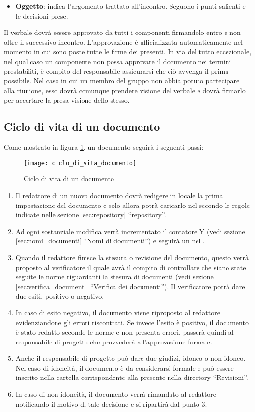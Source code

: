 \begin{itemize}
\begin{itemize}
\item \textbf{Oggetto}: indica l'argomento trattato all'incontro. Seguono i punti salienti e le decisioni prese.
\end{itemize}
Il verbale dovrà essere approvato da tutti i componenti firmandolo entro e non oltre il successivo incontro. L'approvazione è ufficializzata automaticamente nel momento in cui sono poste tutte le firme dei presenti. In via del tutto eccezionale, nel qual caso un componente non possa approvare il documento nei termini prestabiliti, è compito del responsabile assicurarsi che ciò avvenga il prima possibile. Nel caso in cui un membro del gruppo non abbia potuto partecipare alla riunione, esso dovrà comunque prendere visione del verbale e dovrà firmarlo per accertare la presa visione dello stesso.
\end{itemize}

\subsection{Ciclo di vita di un documento}
Come mostrato in figura \ref{fig:ciclo_di_vita_documento}, un documento seguirà i seguenti passi:
\begin{figure}[h]
\centering
\texttt{[image: ciclo\_di\_vita\_documento]}
\caption{Ciclo di vita di un documento} \label{fig:ciclo_di_vita_documento}
\end{figure}
\begin{enumerate}
\item Il redattore di un nuovo documento dovrà redigere in locale la prima impostazione del documento e solo allora potrà caricarlo nel  secondo le regole indicate nelle sezione \ref{sec:repository} ``repository''.
\item Ad ogni sostanziale modifica verrà incrementato il contatore Y (vedi sezione \ref{sec:nomi_documenti} ``Nomi di documenti'') e seguirà un  nel .
\item Quando il redattore finisce la stesura o revisione del documento, questo verrà proposto al verificatore il quale avrà il compito di controllare che siano state seguite le norme riguardanti la stesura di documenti (vedi sezione \ref{sec:verifica_documenti} ``Verifica dei documenti''). Il verificatore potrà dare due esiti, positivo o negativo.
\item In caso di esito negativo, il documento viene riproposto al redattore evidenziandone gli errori riscontrati. Se invece l'esito è positivo, il documento è stato redatto secondo le norme e non presenta errori, passerà quindi al responsabile di progetto che provvederà all'approvazione formale.
\item Anche il responsabile di progetto può dare due giudizi, idoneo o non idoneo. Nel caso di idoneità, il documento è da considerarsi formale e può essere inserito nella cartella corrispondente alla  presente nella directory ``Revisioni''.
\item In caso di non idoneità, il documento verrà rimandato al redattore notificando il motivo di tale decisione e si ripartirà dal punto 3.
\end{enumerate}

